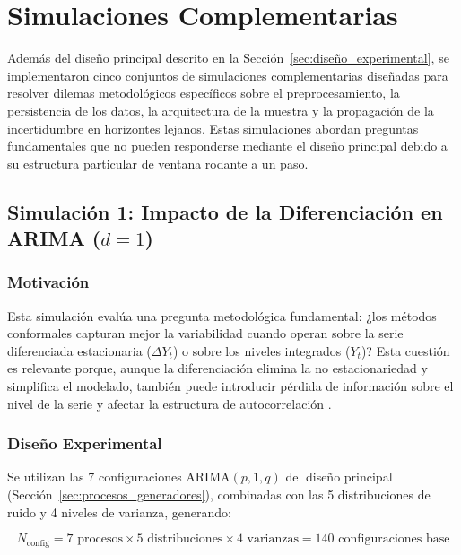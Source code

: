 \section{Simulaciones Complementarias}
\label{sec:simulaciones_complementarias}

Además del diseño principal descrito en la Sección~\ref{sec:diseño_experimental}, se implementaron cinco conjuntos de simulaciones complementarias diseñadas para resolver dilemas metodológicos específicos sobre el preprocesamiento, la persistencia de los datos, la arquitectura de la muestra y la propagación de la incertidumbre en horizontes lejanos. Estas simulaciones abordan preguntas fundamentales que no pueden responderse mediante el diseño principal debido a su estructura particular de ventana rodante a un paso.

\subsection{\texorpdfstring{Simulación 1: Impacto de la Diferenciación en ARIMA ($d=1$)}{Simulación 1: Impacto de la Diferenciación en ARIMA (d=1)}}
\label{subsec:sim1_diferenciacion}

\subsubsection{Motivación}

Esta simulación evalúa una pregunta metodológica fundamental: ¿los métodos conformales capturan mejor la variabilidad cuando operan sobre la serie diferenciada estacionaria ($\Delta Y_t$) o sobre los niveles integrados ($Y_t$)? Esta cuestión es relevante porque, aunque la diferenciación elimina la no estacionariedad y simplifica el modelado, también puede introducir pérdida de información sobre el nivel de la serie y afectar la estructura de autocorrelación \parencite{Hyndman2021FPP3}.

\subsubsection{Diseño Experimental}

Se utilizan las 7 configuraciones ARIMA$(p,1,q)$ del diseño principal (Sección~\ref{sec:procesos_generadores}), combinadas con las 5 distribuciones de ruido y 4 niveles de varianza, generando:

\begin{equation}
N_{\text{config}} = 7 \text{ procesos} \times 5 \text{ distribuciones} \times 4 \text{ varianzas} = 140 \text{ configuraciones base}
\end{equation}

